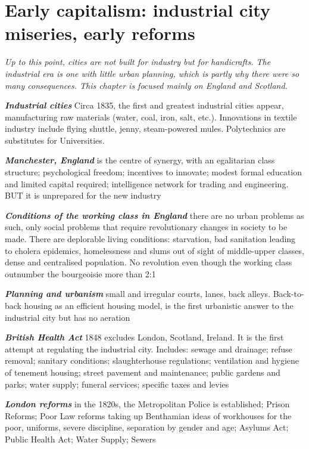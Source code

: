 \documentclass{article}
\newcommand{\bisection}[1]{\textbf{\textit{#1}}}
\newcommand{\alignedmarginpar}[1]{%
        \marginpar{\raggedright\small #1}
    }
\begin{document}
\pagebreak
\section{Early capitalism: industrial city miseries, early reforms}

\textit{Up to this point, cities are not built for industry but for handicrafts. The industrial era is one with little urban planning, which is partly why there were so many consequences. This chapter is focused mainly on England and Scotland.}

\bisection{Industrial cities} Circa 1835, the first and greatest industrial cities appear, manufacturing raw materials (water, coal, iron, salt, etc.). Innovations in textile industry include flying shuttle, jenny, steam-powered mules. Polytechnics are substitutes for Universities.

\bisection{Manchester, England}\alignedmarginpar{first innovative milieu} is the centre of synergy, with an egalitarian class structure; psychological freedom; incentives to innovate; modest formal education and limited capital required; intelligence network for trading and engineering. BUT it is unprepared for the new industry

\bisection{Conditions of the working class in England}\alignedmarginpar{Friedrich Engels} there are no urban problems as such, only social problems that require revolutionary changes in society to be made. There are deplorable living conditions: starvation, bad sanitation leading to cholera epidemics, homelessness and slums out of sight of middle-upper classes, dense and centralised population. No revolution even though the working class outnumber the bourgeoisie more than 2:1

\bisection{Planning and urbanism} small and irregular courts, lanes, back alleys. Back-to-back housing as an efficient housing model, is the first urbanistic answer to the industrial city but has no aeration

\bisection{British Health Act} 1848 excludes London, Scotland, Ireland. It is the first attempt at regulating the industrial city. Includes: sewage and drainage; refuse removal; sanitary conditions; slaughterhouse regulations; ventilation and hygiene of tenement housing; street pavement and maintenance; public gardens and parks; water supply; funeral services; specific taxes and levies

\bisection{London reforms} in the 1820s, the Metropolitan Police is established; Prison Reforms; Poor Law reforms taking up Benthamian ideas of workhouses for the poor, uniforms, severe discipline, separation by gender and age; Asylums Act; Public Health Act; Water Supply; Sewers
\end{document}
